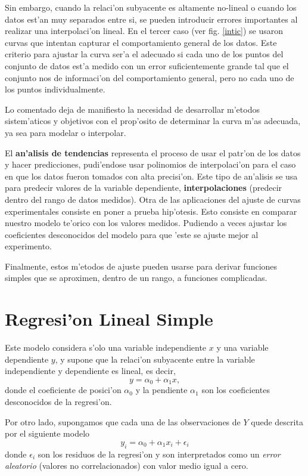 Sin embargo, cuando la relaci'on subyacente es altamente no-lineal o cuando los datos est'an muy separados entre si, se pueden introducir errores importantes al realizar una interpolaci'on lineal. En el tercer caso (ver fig. \ref{intic}) se usaron curvas que intentan capturar el comportamiento general de los datos. Este criterio para ajustar la curva ser'a el adecuado si cada uno de los puntos del conjunto de datos est'a medido con un error suficientemente grande tal que el conjunto nos de informaci'on del comportamiento general, pero no cada uno de los puntos individualmente.

Lo comentado deja de manifiesto la necesidad de desarrollar m'etodos sistem'aticos y objetivos con el prop'osito de determinar la curva m'as adecuada, ya sea para modelar o interpolar.

El \textbf{an'alisis de tendencias} representa el proceso de usar el patr'on de los datos y hacer predicciones, pudi'endose usar polinomios de interpolaci'on para el caso en que los datos fueron tomados con alta precisi'on. Este tipo de an'alisis se usa para predecir valores de la variable dependiente, \textbf{interpolaciones} (predecir dentro del rango de datos medidos).
Otra de las aplicaciones del ajuste de curvas experimentales consiste en poner a prueba hip'otesis. Esto consiste en comparar nuestro modelo te'orico con los valores medidos. Pudiendo a veces ajustar los coeficientes desconocidos del modelo para que 'este se ajuste mejor al experimento.

Finalmente, estos m'etodos de ajuste pueden usarse para derivar funciones simples que se aproximen, dentro de un rango, a funciones complicadas.

\section{Regresi'on Lineal Simple}

Este modelo considera s'olo una variable independiente $x$ y una variable dependiente $y$, y supone que la relaci'on subyacente entre la variable independiente y dependiente es lineal, es decir,
\begin{equation}
y =\alpha_0 + \alpha_1 x,
\end{equation}
donde el coeficiente de posici'on $\alpha_0$ y la pendiente $\alpha_1$ son los coeficientes desconocidos de la regresi'on. 

Por otro lado, supongamos que cada una de las observaciones de $Y$ quede descrita por el siguiente modelo
\begin{equation}
y_i=  \alpha_0 + \alpha_1 x_i +\epsilon_i
\end{equation}
donde $\epsilon_i$ son los residuos de la regresi'on y son interpretados como un \textit{error aleatorio} (valores no correlacionados) con valor medio igual a cero.

